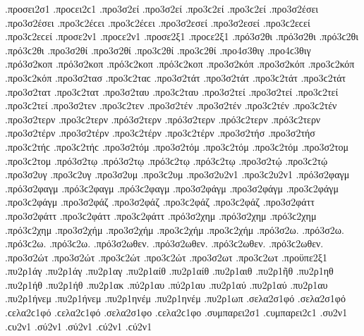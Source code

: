 {.προσει2σ1 .προϲει2ϲ1   %
.προ3σ2εί .προ3σ2εί .προ3ϲ2εί .προ3ϲ2εί   %
.προ3σ2έσει .προ3σ2έσει .προ3ϲ2έϲει .προ3ϲ2έϲει 
.προ3σ2εσεί .προ3σ2εσεί .προ3ϲ2εϲεί .προ3ϲ2εϲεί 
.προσε2ν1 .προϲε2ν1   %
.προσε2ξ1 .προϲε2ξ1   %
.πρό3σ2θι .πρό3σ2θι .πρό3ϲ2θι .πρό3ϲ2θι   %
.προ3σ2θί .προ3σ2θί .προ3ϲ2θί .προ3ϲ2θί 
.προ4σ3θιγ .προ4ϲ3θιγ   %
.πρό3σ2κοπ .πρό3σ2κοπ .πρό3ϲ2κοπ .πρό3ϲ2κοπ   %
.προ3σ2κόπ .προ3σ2κόπ .προ3ϲ2κόπ .προ3ϲ2κόπ 
.προ3σ2τασ .προ3ϲ2ταϲ   %
.προ3σ2τάτ .προ3σ2τάτ .προ3ϲ2τάτ .προ3ϲ2τάτ   %
.προ3σ2τατ .προ3ϲ2τατ   %
.προ3σ2ταυ .προ3ϲ2ταυ   %
.προ3σ2τεί .προ3σ2τεί .προ3ϲ2τεί .προ3ϲ2τεί   %
.προ3σ2τεν .προ3ϲ2τεν   %
.προ3σ2τέν .προ3σ2τέν .προ3ϲ2τέν .προ3ϲ2τέν   %
.προ3σ2τερν .προ3ϲ2τερν   %
.πρό3σ2τερν .πρό3σ2τερν .πρό3ϲ2τερν .πρό3ϲ2τερν   %
.προ3σ2τέρν .προ3σ2τέρν .προ3ϲ2τέρν .προ3ϲ2τέρν 
.προ3σ2τήσ .προ3σ2τήσ .προ3ϲ2τήϲ .προ3ϲ2τήϲ   %
.προ3σ2τόμ .προ3σ2τόμ .προ3ϲ2τόμ .προ3ϲ2τόμ   %
.προ3σ2τομ .προ3ϲ2τομ 
.πρό3σ2τῳ .πρό3σ2τῳ .πρό3ϲ2τῳ .πρό3ϲ2τῳ   %
.προ3σ2τῴ .προ3ϲ2τῴ 
.προ3σ2υγ .προ3ϲ2υγ   %
.προ3σ2υμ .προ3ϲ2υμ   %
.προ3σ2υ2ν1 .προ3ϲ2υ2ν1   %
.πρό3σ2φαγμ .πρό3σ2φαγμ .πρό3ϲ2φαγμ .πρό3ϲ2φαγμ   %
.προ3σ2φάγμ .προ3σ2φάγμ .προ3ϲ2φάγμ .προ3ϲ2φάγμ 
.προ3σ2φάζ .προ3σ2φάζ .προ3ϲ2φάζ .προ3ϲ2φάζ   %
.προ3σ2φάττ .προ3σ2φάττ .προ3ϲ2φάττ .προ3ϲ2φάττ   %
.πρό3σ2χημ .πρό3σ2χημ .πρό3ϲ2χημ .πρό3ϲ2χημ   %
.προ3σ2χήμ .προ3σ2χήμ .προ3ϲ2χήμ .προ3ϲ2χήμ 
.πρό3σ2ω. .πρό3σ2ω. .πρό3ϲ2ω. .πρό3ϲ2ω. 
.πρό3σ2ωθεν. .πρό3σ2ωθεν. .πρό3ϲ2ωθεν. .πρό3ϲ2ωθεν. 
.προ3σ2ώτ .προ3σ2ώτ .προ3ϲ2ώτ .προ3ϲ2ώτ   %
.προ3σ2ωτ .προ3ϲ2ωτ 
.προϋπε2ξ1   %
.πυ2ρ1άγ .πυ2ρ1άγ   %
.πυ2ρ1αγ 
.πυ2ρ1αίθ .πυ2ρ1αίθ   %
.πυ2ρ1αιθ   %
.πυ2ρ1ῆθ   %
.πυ2ρ1ηθ   %
.πυ2ρ1ήθ .πυ2ρ1ήθ   %
.πυ2ρ1ακ   %
.πύ2ρ1αυ .πύ2ρ1αυ   %
.πυ2ρ1αύ .πυ2ρ1αύ 
.πυ2ρ1αυ   %
.πυ2ρ1ήνεμ .πυ2ρ1ήνεμ   %
.πυ2ρ1ηνέμ .πυ2ρ1ηνέμ 
.πυ2ρ1ωπ   %
.σελα2σ1φό .σελα2σ1φό .ϲελα2ϲ1φό .ϲελα2ϲ1φό   %
.σελα2σ1φο .ϲελα2ϲ1φο 
.συμπαρει2σ1 .ϲυμπαρει2ϲ1   %
.συ2ν1 .ϲυ2ν1 
.σύ2ν1 .σύ2ν1 .ϲύ2ν1 .ϲύ2ν1   %
}
